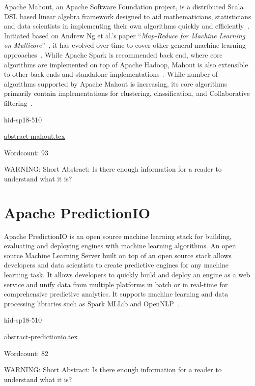Apache Mahout, an Apache Software Foundation project, is a distributed
Scala DSL based linear algebra framework designed to aid
mathematicians, statisticians and data scientists in implementing
their own algorithms quickly and
efficiently~\cite{hid-sp18-510-web-Mahout}. Initiated based on Andrew
Ng et al.'s paper \color{blue}``\emph{Map-Reduce for Machine Learning on
Multicore}''\color{black}~\cite{hid-sp18-510-ng-Mahout}, it has evolved over time to
cover other general machine-learning
approaches~\cite{hid-sp18-510-ibm-Mahout}. While Apache Spark is
recommended back end, where core algorithms are implemented on top of
Apache Hadoop, Mahout is also extensible to other back ends and
standalone implementations~\cite{hid-sp18-510-wiki-Mahout}. While
number of algorithms supported by Apache Mahout is increasing, its
core algorithms primarily contain implementations for clustering,
classification, and Collaborative
filtering~\cite{hid-sp18-510-wiki-Mahout}.


\begin{IU}

hid-sp18-510

\href{https://github.com/cloudmesh-community/hid-sp18-510/blob/master//technology/abstract-mahout.tex}{abstract-mahout.tex}

 

Wordcount: 93

WARNING: Short Abstract: Is there enough information for a reader to understand what it is?

\end{IU}

\section{Apache PredictionIO}

Apache PredictionIO is an open source machine learning stack for
building, evaluating and deploying engines with machine learning
algorithms. An open source Machine Learning Server built on top of an
open source stack allows developers and data scientists to create
predictive engines for any machine learning task. It allows developers
to quickly build and deploy an engine as a web service and unify data
from multiple platforms in batch or in real-time for comprehensive
predictive analytics. It supports machine learning and data processing
libraries such as Spark MLLib and
OpenNLP~\cite{hid-sp18-510-web-PredIO}.


\begin{IU}

hid-sp18-510

\href{https://github.com/cloudmesh-community/hid-sp18-510/blob/master//technology/abstract-predictionio.tex}{abstract-predictionio.tex}

 

Wordcount: 82

WARNING: Short Abstract: Is there enough information for a reader to understand what it is?

\end{IU}

